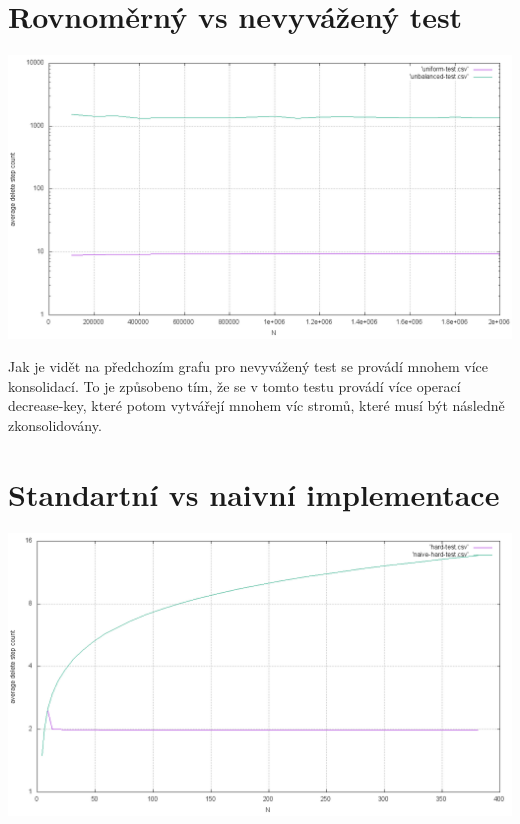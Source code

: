 \documentclass[12pt,a4paper]{report}
\begin{document}
\section{Rovnoměrný vs nevyvážený test}
\includegraphics[width=\textwidth]{./tests/graph1.png}

Jak je vidět na předchozím grafu pro nevyvážený test se provádí mnohem 
více konsolidací. To je způsobeno tím, že se v tomto testu provádí více operací decrease-key,
které potom vytvářejí mnohem víc stromů, které musí být následně zkonsolidovány. 

\section{Standartní vs naivní implementace}
\includegraphics[width=\textwidth]{./tests/graph2.png}


  
\end{document}

